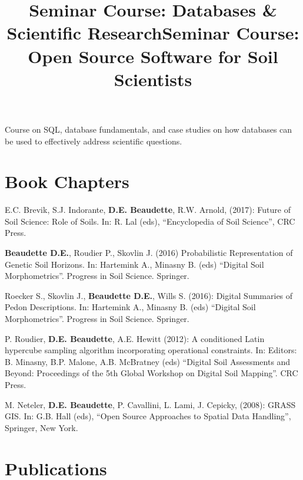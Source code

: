 \documentclass[overlapped,line,10pt,letterpaper]{res}
\begin{document}
\begin{resume}
\title{Seminar Course: Databases \& Scientific Research}
\begin{position}
Course on SQL, database fundamentals, and case studies on how databases 
can be used to effectively address scientific questions.
\end{position}

\title{Seminar Course: Open Source Software for Soil Scientists}
\begin{position}
\end{position}


\section{\bf Book Chapters}
E.C. Brevik, S.J. Indorante, \textbf{D.E. Beaudette}, R.W. Arnold, (2017): Future of Soil Science: Role of Soils. In: R. Lal (eds), ``Encyclopedia of Soil Science'', CRC Press.

\textbf{Beaudette D.E.}, Roudier P., Skovlin J. (2016) Probabilistic Representation of Genetic Soil Horizons. In: Hartemink A., Minasny B. (eds) ``Digital Soil Morphometrics''. Progress in Soil Science. Springer.

Roecker S., Skovlin J., \textbf{Beaudette D.E.}, Wills S. (2016): Digital Summaries of Pedon Descriptions. In: Hartemink A., Minasny B. (eds) ``Digital Soil Morphometrics''. Progress in Soil Science. Springer.

P. Roudier, \textbf{D.E. Beaudette}, A.E. Hewitt (2012): A conditioned Latin hypercube sampling algorithm incorporating operational constraints. In: Editors: B. Minasny, ‎B.P. Malone, ‎A.B. McBratney (eds) ``Digital Soil Assessments and Beyond: Proceedings of the 5th Global Workshop on Digital Soil Mapping''. CRC Press.

M. Neteler, \textbf{D.E. Beaudette}, P. Cavallini, L. Lami, J. Cepicky, (2008): GRASS GIS. In: G.B. Hall (eds), ``Open Source Approaches to Spatial Data Handling'', Springer, New York.


\section{\bf Publications}


\end{resume}
\end{document}
